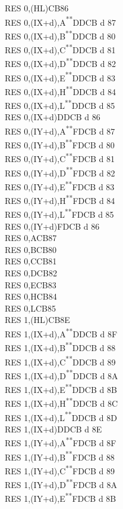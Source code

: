 \documentclass[12pt,twoside,openright,a4paper]{book}
\newcommand{\UNDOC}{\textnormal{\textsuperscript{**}}}
\begin{document}
\begin{multicols}{3}
{\begin{tabbing}
	RES 0,(HL)\>CB86\\
	RES 0,(IX+d),A\UNDOC\>DDCB d 87\\
	RES 0,(IX+d),B\UNDOC\>DDCB d 80\\
	RES 0,(IX+d),C\UNDOC\>DDCB d 81\\
	RES 0,(IX+d),D\UNDOC\>DDCB d 82\\
	RES 0,(IX+d),E\UNDOC\>DDCB d 83\\
	RES 0,(IX+d),H\UNDOC\>DDCB d 84\\
	RES 0,(IX+d),L\UNDOC\>DDCB d 85\\
	RES 0,(IX+d)\>DDCB d 86\\
	RES 0,(IY+d),A\UNDOC\>FDCB d 87\\
	RES 0,(IY+d),B\UNDOC\>FDCB d 80\\
	RES 0,(IY+d),C\UNDOC\>FDCB d 81\\
	RES 0,(IY+d),D\UNDOC\>FDCB d 82\\
	RES 0,(IY+d),E\UNDOC\>FDCB d 83\\
	RES 0,(IY+d),H\UNDOC\>FDCB d 84\\
	RES 0,(IY+d),L\UNDOC\>FDCB d 85\\
	RES 0,(IY+d)\>FDCB d 86\\
	RES 0,A\>CB87\\
	RES 0,B\>CB80\\
	RES 0,C\>CB81\\
	RES 0,D\>CB82\\
	RES 0,E\>CB83\\
	RES 0,H\>CB84\\
	RES 0,L\>CB85\\
	RES 1,(HL)\>CB8E\\
	RES 1,(IX+d),A\UNDOC\>DDCB d 8F\\
	RES 1,(IX+d),B\UNDOC\>DDCB d 88\\
	RES 1,(IX+d),C\UNDOC\>DDCB d 89\\
	RES 1,(IX+d),D\UNDOC\>DDCB d 8A\\
	RES 1,(IX+d),E\UNDOC\>DDCB d 8B\\
	RES 1,(IX+d),H\UNDOC\>DDCB d 8C\\
	RES 1,(IX+d),L\UNDOC\>DDCB d 8D\\
	RES 1,(IX+d)\>DDCB d 8E\\
	RES 1,(IY+d),A\UNDOC\>FDCB d 8F\\
	RES 1,(IY+d),B\UNDOC\>FDCB d 88\\
	RES 1,(IY+d),C\UNDOC\>FDCB d 89\\
	RES 1,(IY+d),D\UNDOC\>FDCB d 8A\\
	RES 1,(IY+d),E\UNDOC\>FDCB d 8B\\

\end{tabbing}}
\end{multicols}
\end{document}
